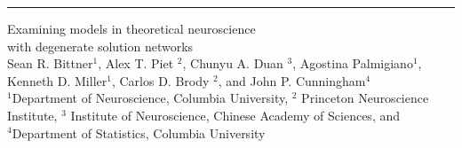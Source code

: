 \documentclass[landscape]{article}
\begin{document}
\color{black}

\hrule width 0pt depth 0pt height 1pt

\begin{center}
  \HUGE
Examining models in theoretical neuroscience \\  with degenerate solution networks \\
  \Large %
  Sean R. Bittner$^{1}$, Alex T. Piet  $^{2}$, Chunyu A. Duan  $^{3}$, Agostina Palmigiano$^{1}$, Kenneth D. Miller$^{1}$, Carlos D. Brody  $^{2}$, and John P. Cunningham$^4$ \\
  \large
  $^{1}$Department of Neuroscience, Columbia University, $^{2}$ Princeton Neuroscience Institute, $^{3}$ Institute of Neuroscience, Chinese Academy of Sciences, and \\ $^{4}$Department of Statistics, Columbia University
\end{center}

\end{document}
